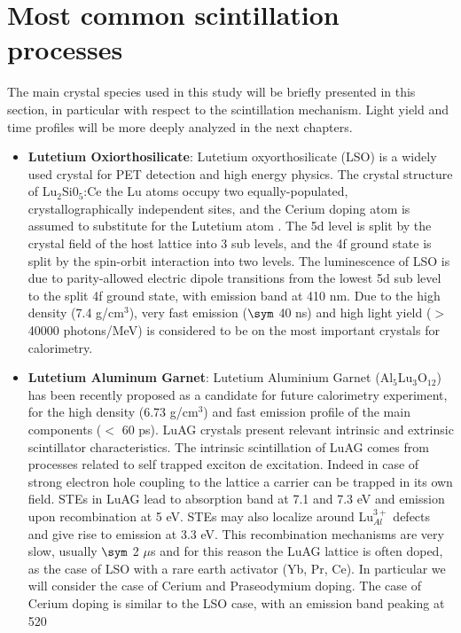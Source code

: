 \section{Most common scintillation processes}
The main crystal species used in this study will be briefly presented in this section, in particular with respect to the scintillation mechanism. Light yield and time profiles will be more deeply analyzed in the next chapters.
\begin{itemize}
\item \textbf{Lutetium Oxiorthosilicate}: Lutetium oxyorthosilicate (LSO) is a widely used crystal for PET detection and high energy physics. The crystal structure of Lu$_{2}$Si0$_{5}$:Ce the Lu atoms occupy two equally-populated, crystallographically independent sites, and the Cerium doping atom is assumed to substitute for the Lutetium atom \cite{Naud1996}.
The 5d level is split by the crystal field of the host lattice into 3 sub levels, and the 4f ground state is split by the spin-orbit interaction into two levels.
The luminescence of LSO is due to parity-allowed electric dipole transitions from the lowest 5d sub level to the split 4f ground state, with emission band at 410 nm.
Due to the high density (7.4 g/cm$^{3}$), very fast emission ($\sym$ 40 ns) and high light yield ($>$40000 photons/MeV) is considered to be on the most important crystals for calorimetry.
\item \textbf{Lutetium Aluminum Garnet}: Lutetium Aluminium Garnet (Al$_{5}$Lu$_{3}$O$_{12}$) has been recently proposed as a candidate for future calorimetry experiment\cite{Kris2013}, for the high density (6.73 g/cm$^{3}$) and fast emission profile of the main components ($<$ 60 ps).
LuAG crystals present relevant intrinsic and extrinsic scintillator characteristics.
The intrinsic scintillation of LuAG comes from processes related to self trapped exciton de excitation. Indeed in case of strong electron hole coupling to the lattice a carrier can be trapped in its own field.
STEs in LuAG lead to absorption band at 7.1 and 7.3 eV and emission upon recombination at 5 eV.
STEs may also localize around Lu$_{Al}^{3+}$ defects and give rise to emission at 3.3 eV.
This recombination mechanisms are very slow, usually $\sym$ 2 $\mu$s and for this reason the LuAG lattice is often doped, as the case of LSO with a rare earth activator (Yb, Pr, Ce).
In particular we will consider the case of Cerium and Praseodymium doping.
The case of Cerium doping is similar to the LSO case, with an emission band peaking at 520

\end{itemize}
